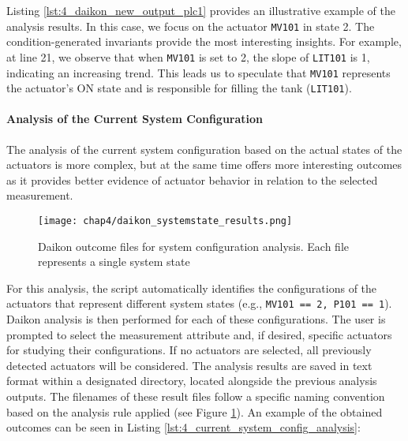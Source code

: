 Listing \ref{lst:4_daikon_new_output_plc1} provides an illustrative example of the analysis results. In this case, we focus on the actuator \texttt{MV101} in state 2.\newline 
The condition-generated invariants provide the most interesting insights. For example, at line 21, we observe that when \texttt{MV101} is set to 2, the slope of \texttt{LIT101} is 1, indicating an increasing trend. This leads us to speculate that \texttt{MV101} represents the actuator's ON state and is responsible for filling the tank (\texttt{LIT101}).

\paragraph{Analysis of the Current System Configuration}
\label{par:4_current_system_config_analysis}
The analysis of the current system configuration based on the actual states of the actuators is more complex, but at the same time offers more interesting outcomes as it provides better evidence of actuator behavior in relation to the selected measurement.

\begin{figure}[ht]
	\centering
	\texttt{[image: chap4/daikon\_systemstate\_results.png]}
	\caption{Daikon outcome files for system configuration analysis. Each file represents a single system state}
	\label{fig:4_daikon_systemstates_files}
\end{figure}

\noindent For this analysis, the script automatically identifies the configurations of the actuators that represent different system states (e.g., \texttt{MV101 == 2, P101 == 1}). Daikon analysis is then performed for each of these configurations. The user is prompted to select the measurement attribute and, if desired, specific actuators for studying their configurations. If no actuators are selected, all previously detected actuators will be considered.\newline
The analysis results are saved in text format within a designated directory, located alongside the previous analysis outputs. The filenames of these result files follow a specific naming convention based on the analysis rule applied (see Figure \ref{fig:4_daikon_systemstates_files}).\newline \newline
An example of the obtained outcomes can be seen in Listing \ref{lst:4_current_system_config_analysis}:


